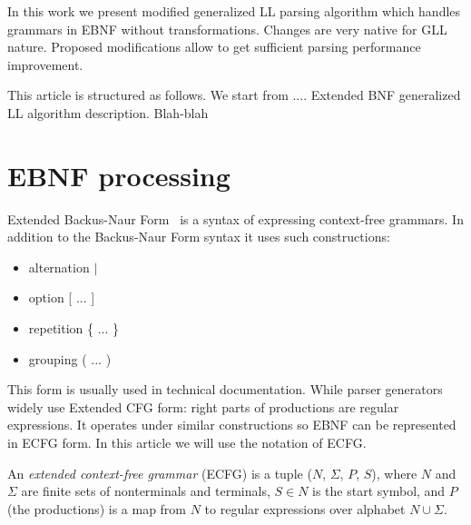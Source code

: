 \documentclass[runningheads,a4paper]{llncs}
\begin{document}
In this work we present modified generalized LL parsing algorithm which handles grammars in EBNF without transformations.
Changes are very native for GLL nature.
Proposed modifications allow to get sufficient parsing performance improvement.

This article is structured as follows.
We start from .... Extended BNF
generalized LL algorithm description.
Blah-blah





\section{EBNF processing}%

Extended Backus-Naur Form~\cite{iso} is a syntax of expressing context-free grammars. In addition to the Backus-Naur Form syntax it 
uses such constructions:
\begin{itemize}
    \item alternation $\mid$
    \item option [ ... ]
    \item repetition \{ ... \}
    \item grouping ( ... )
\end{itemize}
This form is usually used in technical documentation. While parser generators widely use Extended CFG form:
right parts of productions are regular expressions. It operates under similar constructions so EBNF can be represented in ECFG form.
In this article we will use the notation of ECFG.

An \textit{extended context-free grammar} (ECFG) is a tuple ($N$, $\Sigma$, $P$, $S$), where $N$
and $\Sigma$ are finite sets of nonterminals and terminals, $ S\in N$ is the start symbol,
and $P$ (the productions) is a map from $N$ to regular expressions over alphabet $N \cup \Sigma$.

\end{document}
